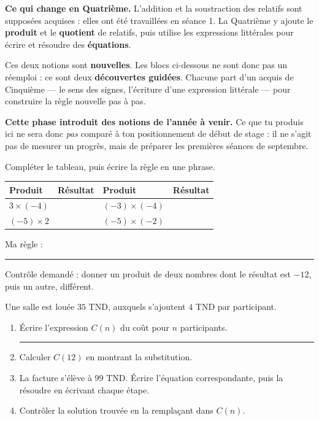 \documentclass[10pt,a4paper]{article}
\begin{document}
\begin{methodbox}
\textbf{Ce qui change en Quatrième.} L'addition et la soustraction des relatifs sont supposées acquises :
elles ont été travaillées en séance 1. La Quatrième y ajoute le \textbf{produit} et le \textbf{quotient} de
relatifs, puis utilise les expressions littérales pour écrire et résoudre des \textbf{équations}.
\par\smallskip
Ces deux notions sont \textbf{nouvelles}. Les blocs ci-dessous ne sont donc pas un réemploi : ce sont deux
\textbf{découvertes guidées}. Chacune part d'un acquis de Cinquième — le sens des signes, l'écriture d'une
expression littérale — pour construire la règle nouvelle pas à pas.
\end{methodbox}
\begin{warningbox}\small
\textbf{Cette phase introduit des notions de l'année à venir.} Ce que tu produis ici ne sera donc
\emph{pas} comparé à ton positionnement de début de stage : il ne s'agit pas de mesurer un progrès,
mais de préparer les premières séances de septembre.
\end{warningbox}


Compléter le tableau, puis écrire la règle en une phrase.
\par\noindent\begin{tabularx}{\linewidth}{>{\bfseries}p{30mm} X >{\bfseries}p{30mm} X}
\toprule
Produit & Résultat & Produit & Résultat \\
\midrule
$3 \times (-4)$ & & $(-3)\times(-4)$ & \\
$(-5)\times 2$ & & $(-5)\times(-2)$ & \\
\bottomrule
\end{tabularx}
\par\vspace{1mm}
Ma règle : \rule{125mm}{0.32pt}
\par\vspace{1mm}
Contrôle demandé : donner un produit de deux nombres dont le résultat est $-12$, puis un autre, différent.

Une salle est louée $35$ TND, auxquels s'ajoutent $4$ TND par participant.
\begin{enumerate}
\item Écrire l'expression $C(n)$ du coût pour $n$ participants. \rule{60mm}{0.32pt}
\item Calculer $C(12)$ en montrant la substitution.
\item La facture s'élève à $99$ TND. Écrire l'équation correspondante, puis la résoudre en écrivant chaque étape.
\item Contrôler la solution trouvée en la remplaçant dans $C(n)$.
\end{enumerate}
\end{document}

